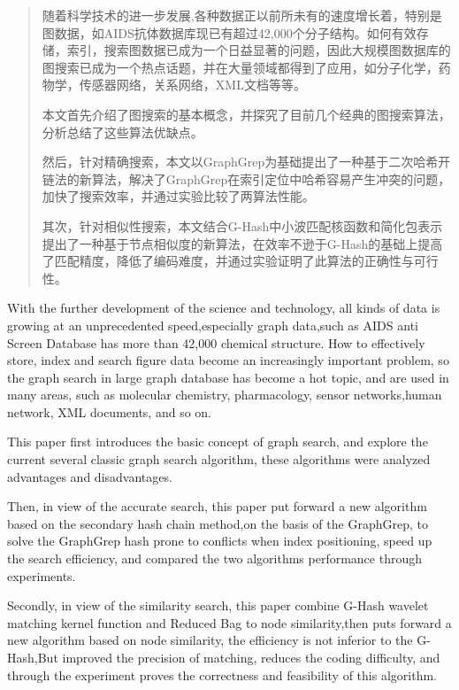 \documentclass{XDBAthesis}
\begin{document}
\else
\fi
\begin{abstract}
    随着科学技术的进一步发展,各种数据正以前所未有的速度增长着，特别是图数据，如AIDS抗体数据库现已有超过42,000个分子结构。如何有效存储，索引，搜索图数据已成为一个日益显著的问题，因此大规模图数据库的图搜索已成为一个热点话题，并在大量领域都得到了应用，如分子化学，药物学，传感器网络，关系网络，XML文档等等。
    
    本文首先介绍了图搜索的基本概念，并探究了目前几个经典的图搜索算法，分析总结了这些算法优缺点。
    
    然后，针对精确搜索，本文以GraphGrep为基础提出了一种基于二次哈希开链法的新算法，解决了GraphGrep在索引定位中哈希容易产生冲突的问题，加快了搜索效率，并通过实验比较了两算法性能。
    
    其次，针对相似性搜索，本文结合G-Hash中小波匹配核函数和简化包表示提出了一种基于节点相似度的新算法，在效率不逊于G-Hash的基础上提高了匹配精度，降低了编码难度，并通过实验证明了此算法的正确性与可行性。
    
    
\end{abstract}
\begin{englishabstract}
With the further development of the science and technology, all kinds of data is growing at an unprecedented speed,especially graph data,such as AIDS anti Screen Database has more than 42,000 chemical structure.  How to effectively store, index and search figure data become an increasingly important problem, so the graph search in large graph database has become a hot topic, and are used in many areas, such as molecular chemistry, pharmacology, sensor networks,human network, XML documents, and so on.

This paper first introduces the basic concept of graph search, and explore the current several classic graph search algorithm, these algorithms were analyzed advantages and disadvantages.

Then, in view of the accurate search, this paper put forward a new algorithm based on the secondary hash chain method,on the basis of the GraphGrep, to solve the GraphGrep hash prone to conflicts when index positioning, speed up the search efficiency, and compared the two algorithms performance through experiments.

Secondly, in view of the similarity search, this paper combine G-Hash wavelet matching kernel function and Reduced Bag to node similarity,then puts forward a new algorithm based on node similarity, the efficiency is not inferior to the G-Hash,But improved the precision of matching, reduces the coding difficulty, and through the experiment proves the correctness and feasibility of this algorithm.

\end{englishabstract}



\ifx\allfiles\undefined
%
%
\end{document}
